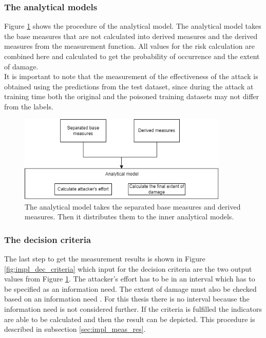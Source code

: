 \subsubsection*{The analytical models}

Figure \ref{fig:impl_ana_mod} shows the procedure of the analytical model. The analytical model takes the base measures that are not calculated into derived measures and the derived measures from the measurement function. All values for the risk calculation are combined here and calculated to get the probability of occurrence and the extent of damage. \\ It is important to note that the measurement of the effectiveness of the attack is obtained using the predictions from the test dataset, since during the attack at training time both the original and the poisoned training datasets may not differ from the labels.

\begin{figure}[ht!]
  \centering
  \includegraphics[width=10cm]{pictures/impl_ana_mod.png}
  \caption{The analytical model takes the separated base measures and derived measures. Then it distributes them to the inner analytical models.}
  \label{fig:impl_ana_mod}
\end{figure}

\subsubsection*{The decision criteria}

The last step to get the measurement results is shown in Figure \ref{fig:impl_dec_criteria} which input for the decision criteria are the two output values from Figure \ref{fig:impl_ana_mod}. The attacker's effort has to be in an interval which has to be specified as an information need. The extent of damage must also be checked based on an information need \cite{ISO_27004_2009}. For this thesis there is no interval because the information need is not considered further. If the criteria is fulfilled the indicators are able to be calculated and then the result can be depicted. This procedure is described in subsection \ref{sec:impl_meas_res}.


